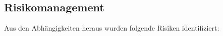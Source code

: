 \begin{flushleft}
    \section{Risikomanagement}
    Aus den Abhängigkeiten heraus wurden folgende Risiken identifiziert:
\begin{table}[H]
\end{table}
\end{flushleft}
